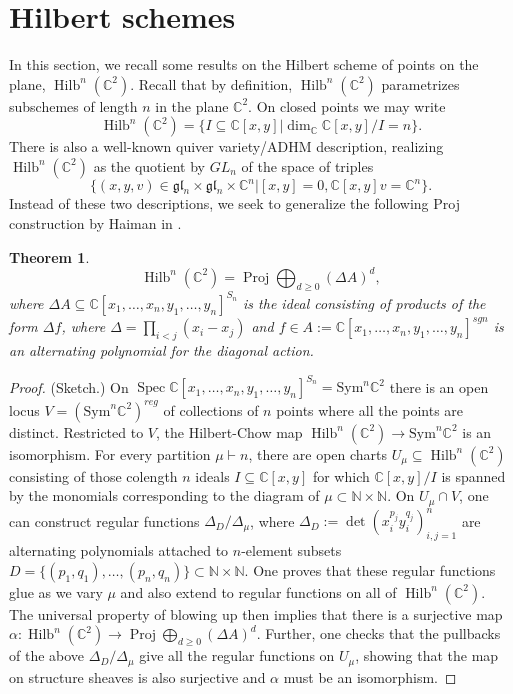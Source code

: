 \documentclass{amsart}
\numberwithin{equation}{section}
\newtheorem{theorem}[lemma]{Theorem}%
\theoremstyle{definition}
\def\Sym{{\mathrm{Sym}}}
\DeclareMathOperator{\Hilb}{Hilb}
\DeclareMathOperator{\Spec}{Spec}
\DeclareMathOperator{\Proj}{\mathrm{Proj}}
\newcommand{\fl}{\mathfrak{l}}
\newcommand{\fg}{\mathfrak{g}}
\newcommand{\C}{{\mathbb C}}
\newcommand{\N}{{\mathbb N}}
\begin{document}
\section{Hilbert schemes}
\label{sec:hilb}
In this section, we recall some results on the Hilbert scheme of points on the plane, $\Hilb^n(\C^2)$.
Recall that by definition, $\Hilb^n(\C^2)$ parametrizes subschemes of length $n$ in the plane $\C^2$.     On closed points we may write 
    $$\Hilb^n(\C^2)=\{I\subseteq \C[x,y]|\dim_\C\C[x,y]/I=n\}.$$
    There is also a well-known quiver variety/ADHM description, realizing $\Hilb^n(\C^2)$ as the quotient by $GL_n$ of the space of triples $$\{(x,y,v)\in \fg\fl_n\times\fg\fl_n\times \C^n| [x,y]=0, \C[x,y]v=\C^n\}.$$ Instead of these two descriptions, we seek to generalize the following Proj construction by Haiman in \cite{Hai1}.
\begin{theorem}
\label{thm:haimanhilb}
$$\Hilb^n(\C^2)=\Proj\bigoplus_{d\geq 0} (\Delta A)^d,$$ where $\Delta A\subseteq \C[x_1,\ldots,x_n, y_1,\ldots,y_n]^{S_n}$ is the ideal consisting of products of the form $\Delta f$, where $\Delta=\prod_{i<j}(x_i-x_j)$ and $f\in A:=\C[x_1,\ldots, x_n,y_1,\ldots,y_n]^{sgn}$ is an alternating polynomial for the diagonal action.
\end{theorem}
\begin{proof} (Sketch.)
    On $\Spec \C[x_1,\ldots,x_n, y_1,\ldots, y_n]^{S_n}=\Sym^n \C^2$ there is an open locus $V=(\Sym^n\C^2)^{reg}$ of collections of $n$ points where all the points are distinct. Restricted to $V$, the Hilbert-Chow map $\Hilb^n(\C^2)\to \Sym^n \C^2$ is an isomorphism.
    For every partition $\mu\vdash n$, there are open charts $U_\mu \subseteq \Hilb^n(\C^2)$ consisting of those colength $n$ ideals $I\subseteq \C[x,y]$ for which $\C[x,y]/I$ is spanned by the monomials corresponding to the diagram of $\mu \subset \N\times \N$. On $U_\mu\cap V$, one can construct regular functions $\Delta_D/\Delta_\mu$, where $\Delta_D:=\det(x_i^{p_j}y_i^{q_j})_{i,j=1}^n$ are alternating polynomials attached to $n$-element subsets $D=\{(p_1,q_1),\ldots, (p_n,q_n)\}\subset \N\times \N$. One proves that these regular functions glue as we vary $\mu$ and also extend to regular functions on all of $\Hilb^n(\C^2)$. The universal property of blowing up then implies that there is a surjective map $\alpha: \Hilb^n(\C^2)\to \Proj\bigoplus_{d\geq 0} (\Delta A)^d$. Further, one checks that the pullbacks of the above $\Delta_D/\Delta_\mu$ give all the regular functions on $U_\mu$, showing that the map on structure sheaves is also surjective and $\alpha$ must be an isomorphism.
\end{proof}
\end{document}
